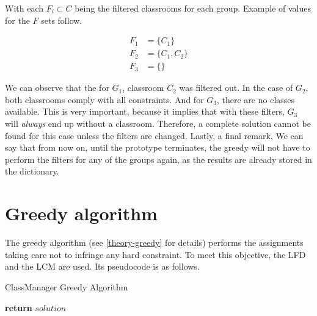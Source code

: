 With each $F_{i} \subset C$ being the filtered classrooms for each group. Example of values for the $F$ sets follow.

\begin{align}
    F_{1} &= \{ C_{1} \}\\
    F_{2} &= \{ C_{1}, C_{2} \}\\
    F_{3} &= \{ \}
\end{align}

We can observe that the for $G_{1}$, classroom $C_{2}$ was filtered out. In the case of $G_{2}$, both classrooms comply with all constraints. And for $G_{3}$, there are no classes available. This is very important, because it implies that with these filters, $G_{3}$ will \textit{always} end up without a classroom. Therefore, a complete solution cannot be found for this case unless the filters are changed. Lastly, a final remark. We can say that from now on, until the prototype terminates, the greedy will not have to perform the filters for any of the groups again, as the results are already stored in the dictionary. 



\section{Greedy algorithm}

The greedy algorithm (see \ref{theory-greedy} for details) performs the assignments taking care not to infringe any hard constraint. To meet this objective, the LFD and the LCM are used. Its pseudocode is as follows.

\begin{algorithm}[H]
    \caption{ClassManager Greedy Algorithm}
    \begin{algorithmic}[1]
                    \Else
                    \EndIf
                \EndIf
            \EndFor
            \State \textbf{return} $solution$
        \EndProcedure
    \end{algorithmic}
\end{algorithm}

